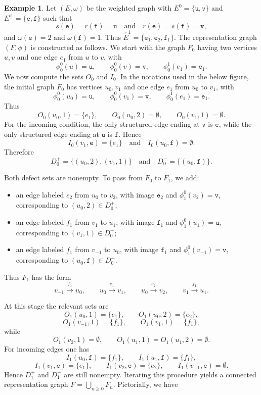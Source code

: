 \documentclass{article}
\theoremstyle{definition}
\newtheorem{example}{Example}
\begin{document}
\begin{example}\label{ex:prescribed-lift-both-defects}
Let $(E,\omega)$ be the weighted graph with $E^0=\{\mathtt{u},\mathtt{v}\}$ and $E^{\mathrm{st}}=\{\mathtt{e},\mathtt{f}\}$ such that 
$$
s(\mathtt{e})=r(\mathtt{f})=\mathtt{u}\quad\text{and}\quad
r(\mathtt{e})=s(\mathtt{f})=\mathtt{v},
$$
and $\omega(\mathtt{e})=2$ and $\omega(\mathtt{f})=1$.
Thus $\widehat E^1=\{\mathtt{e}_1,\mathtt{e}_2,\mathtt{f}_1\}$. The representation graph $(F,\phi)$ is constructed as follows. We start with the graph $F_0$ having two vertices $u,v$ and one edge $e_1$ from $u$ to $v$, with
$$
\phi_0^0(u)=\mathtt{u},\qquad
\phi_0^0(v)=\mathtt{v},\qquad
\phi_0^1(e_1)=\mathtt{e}_1.
$$
We now compute the sets $O_0$ and $I_0$. In the notations used in the below figure, the initial graph $F_0$ has vertices $u_0,v_1$ and one edge $e_1$ from $u_0$ to $v_1$, with
$$
\phi_0^0(u_0)=\mathtt{u},\qquad
\phi_0^0(v_1)=\mathtt{v},\qquad
\phi_0^1(e_1)=\mathtt{e}_1.
$$
Thus
$$
O_0(u_0,1)=\{e_1\},\qquad O_0(u_0,2)=\emptyset,\qquad
O_0(v_1,1)=\emptyset.
$$
For the incoming condition, the only structured edge ending at $\mathtt{v}$
is $\mathtt{e}$, while the only structured edge ending at $\mathtt{u}$ is
$\mathtt{f}$. Hence
$$
I_0(v_1,\mathtt{e})=\{e_1\}\quad\text{and}\quad I_0(u_0,\mathtt{f})=\emptyset.
$$
Therefore
$$
D_0^+=\{(u_0,2),(v_1,1)\}\quad\text{and}\quad
D_0^-=\{(u_0,\mathtt{f})\}.
$$

Both defect sets are nonempty. To pass from $F_0$ to $F_1$, we add:
\begin{itemize}
\item[$\cdot$] an edge labeled $e_2$ from $u_0$ to $v_2$, with image
$\mathtt{e}_2$ and $\phi_1^0(v_2)=\mathtt{v}$, corresponding to
$(u_0,2)\in D_0^+$;
\item[$\cdot$] an edge labeled $f_1$ from $v_1$ to $u_1$, with image
$\mathtt{f}_1$ and $\phi_1^0(u_1)=\mathtt{u}$, corresponding to
$(v_1,1)\in D_0^+$;
\item[$\cdot$] an edge labeled $f_1$ from $v_{-1}$ to $u_0$, with image
$\mathtt{f}_1$ and $\phi_1^0(v_{-1})=\mathtt{v}$, corresponding to
$(u_0,\mathtt{f})\in D_0^-$.
\end{itemize}
Thus $F_1$ has the form
$$
v_{-1}\xrightarrow{f_1}u_0,\qquad
u_0\xrightarrow{e_1}v_1,\qquad
u_0\xrightarrow{e_2}v_2,\qquad
v_1\xrightarrow{f_1}u_1.
$$

At this stage the relevant sets are
$$
O_1(u_0,1)=\{e_1\},\qquad O_1(u_0,2)=\{e_2\},
$$
$$
O_1(v_{-1},1)=\{f_1\},\qquad O_1(v_1,1)=\{f_1\},
$$
while
$$
O_1(v_2,1)=\emptyset,\qquad
O_1(u_1,1)=O_1(u_1,2)=\emptyset.
$$
For incoming edges one has
$$
I_1(u_0,\mathtt{f})=\{f_1\},\qquad
I_1(u_1,\mathtt{f})=\{f_1\},
$$
$$
I_1(v_1,\mathtt{e})=\{e_1\},\qquad
I_1(v_2,\mathtt{e})=\{e_2\},\qquad
I_1(v_{-1},\mathtt{e})=\emptyset.
$$
Hence $D_1^+$ and $D_1^-$ are still nonempty. Iterating this procedure
yields a connected representation graph $F=\bigcup_{n\geq 0}F_n$. 
Pictorially, we have


\end{example}
\end{document}
